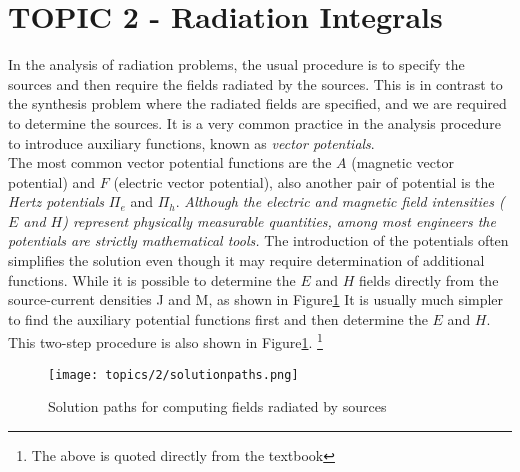 \documentclass[class=article, crop=false]{standalone}
\begin{document}
    \section{TOPIC 2 - Radiation Integrals}
    In the analysis of radiation problems, the usual procedure is to specify the sources and
    then require the fields radiated by the sources.
    This is in contrast to the synthesis problem where the radiated fields are specified,
    and we are required to determine the sources.
    It is a very common practice in the analysis procedure to introduce auxiliary functions,
    known as \emph{vector potentials}. \\
    The most common vector potential functions are the $A$ (magnetic vector potential) and $F$
    (electric vector potential), also another pair of potential is the \emph{Hertz potentials} $\Pi_e$ and $\Pi_h$.
    \emph{
        Although the electric and magnetic field intensities ($E$ and $H$) represent physically measurable
        quantities, among most engineers the potentials are strictly mathematical tools.
    }
    The introduction of the potentials often simplifies the solution even though it may require
    determination of additional functions. While it is possible to determine the $E$ and $H$
    fields directly from the source-current densities J and M, as shown in Figure\ref{fig:solutionpaths}
    It is usually much simpler to find the auxiliary potential functions first and then determine the $E$ and $H$.
    This two-step procedure is also shown in Figure\ref{fig:solutionpaths}.
    \footnote{
        The above is quoted directly from the textbook\cite{BALANIS}
    }\\

    \begin{figure}[h!]
        \texttt{[image: topics/2/solutionpaths.png]}
        \caption{Solution paths for computing fields radiated by sources \cite{BALANIS}}
        \label{fig:solutionpaths}
    \end{figure}

    \newpage
\end{document}
